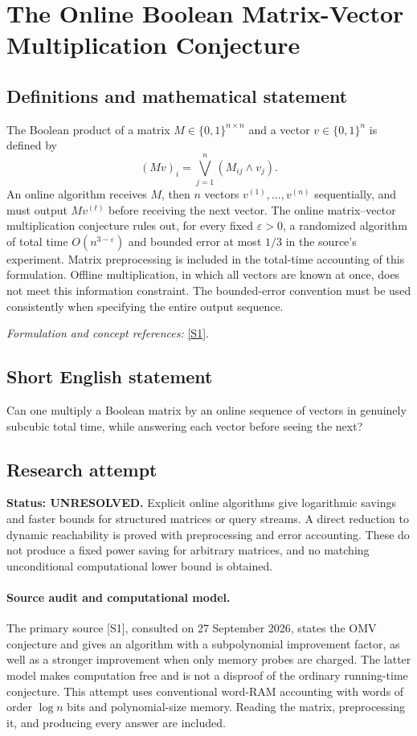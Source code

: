 \documentclass[11pt]{article}
\begin{document}
\section*{\texorpdfstring{The Online Boolean Matrix-Vector Multiplication Conjecture}{The Online Boolean Matrix-Vector Multiplication Conjecture}}\label{statement}
\subsection{Definitions and mathematical statement}
The Boolean product of a matrix $M\in\{0,1\}^{n\times n}$ and a vector $v\in\{0,1\}^n$ is defined by
\[
 (Mv)_i=\bigvee_{j=1}^n(M_{ij}\wedge v_j).
\]
An online algorithm receives $M$, then $n$ vectors $v^{(1)},\ldots,v^{(n)}$ sequentially, and must output $Mv^{(t)}$ before receiving the next vector. The online matrix--vector multiplication conjecture rules out, for every fixed ${\varepsilon}>0$, a randomized algorithm of total time $O(n^{3-{\varepsilon}})$ and bounded error at most $1/3$ in the source's experiment. Matrix preprocessing is included in the total-time accounting of this formulation. Offline multiplication, in which all vectors are known at once, does not meet this information constraint. The bounded-error convention must be used consistently when specifying the entire output sequence.
\par\smallskip\textit{Formulation and concept references:} \href{https://people.csail.mit.edu/virgi/6.1420/papers/omvalg.pdf}{[S1]}.

\subsection{Short English statement}
Can one multiply a Boolean matrix by an online sequence of vectors in genuinely subcubic total time, while answering each vector before seeing the next?
\subsection{Research attempt}
\textbf{Status: UNRESOLVED.} Explicit online algorithms give logarithmic savings and faster bounds for structured matrices or query streams. A direct reduction to dynamic reachability is proved with preprocessing and error accounting. These do not produce a fixed power saving for arbitrary matrices, and no matching unconditional computational lower bound is obtained.

\paragraph{Source audit and computational model.}
The primary source [S1], consulted on 27 September 2026, states the OMV conjecture and gives an algorithm with a subpolynomial improvement factor, as well as a stronger improvement when only memory probes are charged. The latter model makes computation free and is not a disproof of the ordinary running-time conjecture. This attempt uses conventional word-RAM accounting with words of order $\log n$ bits and polynomial-size memory. Reading the matrix, preprocessing it, and producing every answer are included.
\end{document}

